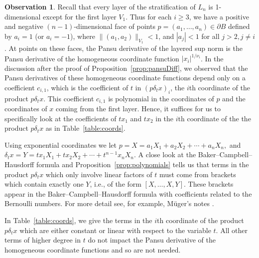 \documentclass{article}
\theoremstyle{definition}
\newtheorem{observation}[theorem]{Observation}
\newcommand{\norm}[1]{\|#1\|}
\begin{document}
\begin{observation} Recall that every layer of the stratification of $L_n$ is 1-dimensional except for the first layer $V_1$. Thus for each $i\geq 3$, we have a positive and negative $(n-1)$-dimensional face of points $p = (a_1, \ldots, a_n) \in \partial B$ defined by $a_i =1$ (or $a_i = -1$), where $\norm{(a_1,a_2)}_{V_1} < 1$, and  $|a_j| <1$ for all $j>2, j\neq i$. At points on these faces, the Pansu derivative of the layered sup norm is the Pansu derivative of the homogeneous coordinate function $|x_i|^{1/\nu_i}$. In the discussion after the proof of Proposition~\ref{prop:pansuDiff}, we observed that the Pansu derivatives of these homogeneous coordinate functions depend only on a coefficient $c_{i,1}$, which is the coefficient of $t$ in $(p\delta_tx)_i$, the $i$th coordinate of the product $p\delta_tx$. This coefficient $c_{i,1}$ is polynomial in the coordinates of $p$ and the coordinates of $x$ coming from the first layer. Hence, it suffices for us to specifically look at the coefficients of $tx_1$ and $tx_2$ in the $i$th coordinate of the the product $p\delta_tx$ as in Table~\ref{table:coords}.

Using exponential coordinates we let 
$p = X = a_1 X_1 + a_2 X_2 + \cdots + a_nX_n,$ and 
$\delta_tx = Y =  tx_1X_1 + tx_2X_2 + \cdots + t^{n-1}x_nX_n.$
A close look at the Baker--Campbell--Hausdorff formula and Proposition~\ref{prop:polynomials} tells us that terms in the product $p\delta_tx$ which only involve linear factors of $t$ must come from brackets which contain exactly one $Y$, i.e., of the form $[X, \ldots, X, Y]$. These brackets appear in the Baker--Campbell--Hausdorff formula with coefficients related to the Bernoulli numbers. For more detail see, for example, M\"uger's notes \cite{muger-notes}.

In Table~\ref{table:coords}, we give the terms in the $i$th coordinate of the product $p\delta_t x$ which are either constant or linear with respect to the variable $t$. All other terms of higher degree in $t$ do not impact the Pansu derivative of the homogeneous coordinate functions and so are not needed.



\end{observation}
\end{document}
